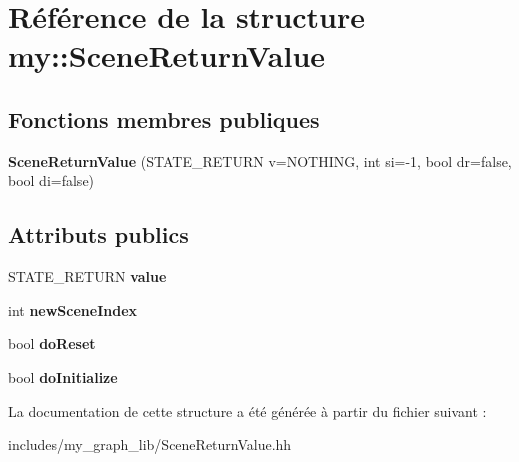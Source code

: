 \hypertarget{structmy_1_1SceneReturnValue}{}\section{Référence de la structure my\+:\+:Scene\+Return\+Value}
\label{structmy_1_1SceneReturnValue}
\subsection*{Fonctions membres publiques}
\begin{DoxyCompactItemize}
\item 
\mbox{\label{structmy_1_1SceneReturnValue_a0dac555f3304ef33b0839692ec59cd2d}} 
{\bfseries Scene\+Return\+Value} (S\+T\+A\+T\+E\+\_\+\+R\+E\+T\+U\+RN v=N\+O\+T\+H\+I\+NG, int si=-\/1, bool dr=false, bool di=false)
\end{DoxyCompactItemize}
\subsection*{Attributs publics}
\begin{DoxyCompactItemize}
\item 
\mbox{\label{structmy_1_1SceneReturnValue_af7b6ef22567ba94a7126cdf81039441f}} 
S\+T\+A\+T\+E\+\_\+\+R\+E\+T\+U\+RN {\bfseries value}
\item 
\mbox{\label{structmy_1_1SceneReturnValue_a1b84c148614e916787461194da79c37c}} 
int {\bfseries new\+Scene\+Index}
\item 
\mbox{\label{structmy_1_1SceneReturnValue_a28718d25ad9b2bd6689b8d42cbc743eb}} 
bool {\bfseries do\+Reset}
\item 
\mbox{\label{structmy_1_1SceneReturnValue_a9cdd936ae735a41f93506da4a6a823aa}} 
bool {\bfseries do\+Initialize}
\end{DoxyCompactItemize}


La documentation de cette structure a été générée à partir du fichier suivant \+:\begin{DoxyCompactItemize}
\item 
includes/my\+\_\+graph\+\_\+lib/Scene\+Return\+Value.\+hh\end{DoxyCompactItemize}
